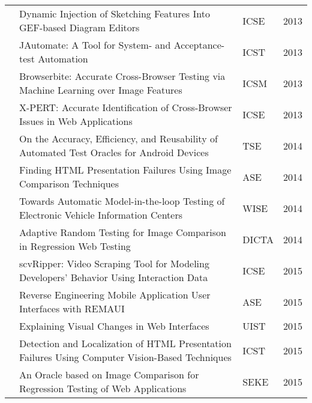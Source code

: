 \begin{sidewaystable}
\begin{tabular}{@{} lp{12.9cm}ll @{}}
\citet{Scharf-2013-ICSE}     & Dynamic Injection of Sketching Features Into GEF-based Diagram Editors                                                              & ICSE           & 2013          \\
\citet{Alegroth-2013-ICST}   & JAutomate: A Tool for System- and Acceptance-test Automation                                                                        & ICST           & 2013          \\
\citet{Semenenko-2013-ICSM}  & Browserbite: Accurate Cross-Browser Testing via Machine Learning over Image Features                                                & ICSM           & 2013          \\
\citet{Choudhary-2013-ICSE}  & X-PERT: Accurate Identification of Cross-Browser Issues in Web Applications                                                         & ICSE           & 2013          \\
\citet{Lin-2014-TSE}         & On the Accuracy, Efficiency, and Reusability of Automated Test Oracles for Android Devices                                          & TSE            & 2014          \\
\citet{Mahajan-2014-ASE}     & Finding HTML Presentation Failures Using Image Comparison Techniques                                                                & ASE            & 2014          \\
\citet{Amalfitano-2014-WISE} & Towards Automatic Model-in-the-loop Testing of Electronic Vehicle Information Centers                                               & WISE           & 2014          \\
\citet{Selay-2014-DICTA}     & Adaptive Random Testing for Image Comparison in Regression Web Testing                                                              & DICTA          & 2014          \\

\citet{Bao-2015-ICSE}        & scvRipper: Video Scraping Tool for Modeling Developers' Behavior Using Interaction Data                                             & ICSE           & 2015          \\

\citet{Nguyen-2015-ASE}      & Reverse Engineering Mobile Application User Interfaces with REMAUI                                                                  & ASE            & 2015          \\
\citet{Burg-2015-UIST}       & Explaining Visual Changes in Web Interfaces                                                                                         & UIST           & 2015          \\
\citet{Mahajan-2015-ICST}    & Detection and Localization of HTML Presentation Failures Using Computer Vision-Based Techniques                                     & ICST           & 2015          \\
\citet{Hori-2015-SEKE}       & An Oracle based on Image Comparison for Regression Testing of Web Applications                                                      & SEKE           & 2015          \\


\end{tabular}
\end{sidewaystable}
